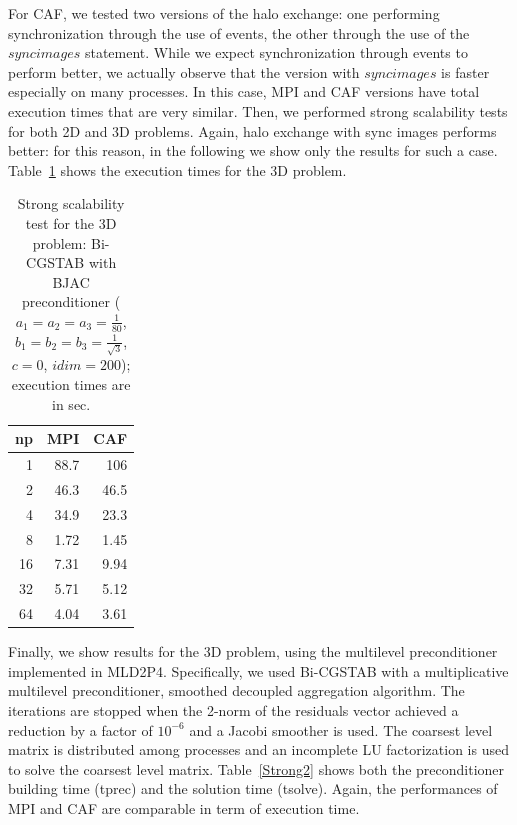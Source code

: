 \documentclass{IOS-Book-Article}
\begin{document}
For CAF, we tested two versions of the halo exchange: one performing synchronization through the use of events, the other through the use of the $sync images$ statement. While we expect  synchronization through events to perform better, we actually observe that the version with $sync images$ is faster especially on many processes. In this case, MPI and CAF versions have total execution times that are very similar. 
%
Then, we performed strong scalability tests for both 2D and 3D problems. Again, halo exchange with sync images performs better: 
for this reason, in the following we show only the results for such a case. Table~\ref{strong} shows the execution times for the 3D problem.
\begin{table}[ht]
\centering
\caption{Strong scalability test for the 3D problem: Bi-CGSTAB with BJAC preconditioner ($a_1=a_2=a_3=\frac{1}{80}$, $b_1=b_2=b_3=\frac{1}{\sqrt{3}}$, $c=0$, $idim=200$); 
execution times are in sec.}
\label{strong}
\begin{tabular}{@{}rrr@{}}
\toprule
\multicolumn{1}{c}{np} & \multicolumn{1}{c}{MPI} & \multicolumn{1}{c}{CAF} \\ \midrule
1                      & 88.7                  & 106                  \\
2                      & 46.3                  & 46.5                  \\
4                      & 34.9                  & 23.3                  \\
8                      & 1.72                  & 1.45                  \\
16                     & 7.31                  & 9.94                  \\
32                     & 5.71                  & 5.12                  \\
64                     & 4.04                  & 3.61                  \\ \bottomrule
\end{tabular}
\end{table} 

Finally, we show results for the 3D problem, using the multilevel preconditioner implemented in MLD2P4. Specifically, we used Bi-CGSTAB with a multiplicative multilevel preconditioner, smoothed decoupled aggregation algorithm. The iterations are stopped when the 2-norm of the residuals vector achieved a reduction by a factor of $10^{-6}$ and a Jacobi smoother is used. The coarsest level matrix is distributed among processes and an incomplete LU factorization is used to solve the coarsest level matrix. Table~\ref{Strong2}  shows    
both the preconditioner building time (tprec) and the solution time (tsolve). Again, the performances of MPI and CAF are comparable in term of execution time. 
\end{document}
